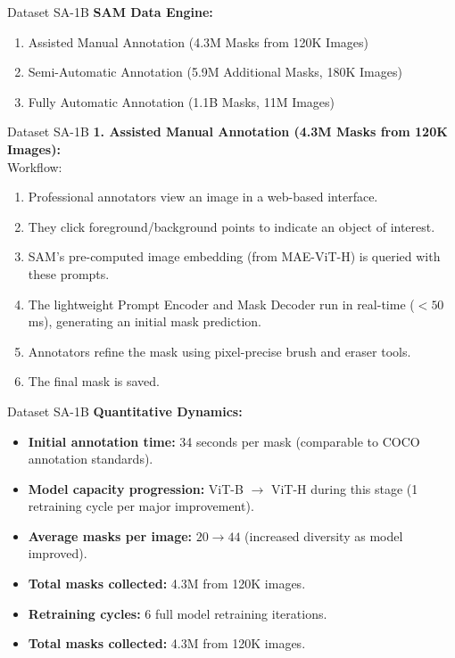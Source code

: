 \documentclass[11pt, aspectratio=169]{beamer}
\begin{document}
\begin{frame}{Dataset SA-1B}
	\textbf{SAM Data Engine:}
	\begin{enumerate}
		\item Assisted Manual Annotation (4.3M Masks from 120K Images)
		\item Semi-Automatic Annotation (5.9M Additional Masks, 180K Images)
		\item Fully Automatic Annotation (1.1B Masks, 11M Images)
	\end{enumerate}
\end{frame}

\begin{frame}{Dataset SA-1B}
	\textbf{1. Assisted Manual Annotation (4.3M Masks from 120K Images):} \\
	Workflow:
	\begin{enumerate}
		\item Professional annotators view an image in a web-based interface.
		\item They click foreground/background points to indicate an object of interest.
		\item SAM's pre-computed image embedding (from MAE-ViT-H) is queried with these prompts.
		\item The lightweight Prompt Encoder and Mask Decoder run in real-time ($< 50$ms), generating an initial mask prediction.
		\item Annotators refine the mask using pixel-precise brush and eraser tools.
		\item The final mask is saved.
	\end{enumerate}
\end{frame}

\begin{frame}{Dataset SA-1B}
	\textbf{Quantitative Dynamics:} \\
	\begin{itemize}
		\item \textbf{Initial annotation time:} 34 seconds per mask (comparable to COCO annotation standards).
		\item \textbf{Model capacity progression:} ViT-B $\rightarrow$ ViT-H during this stage (1 retraining cycle per major improvement).
		\item \textbf{Average masks per image:} $20 \rightarrow 44$ (increased diversity as model improved).
		\item \textbf{Total masks collected:} 4.3M from 120K images.
		\item \textbf{Retraining cycles:} 6 full model retraining iterations.
		\item \textbf{Total masks collected:} 4.3M from 120K images.
	\end{itemize}
\end{frame}
\end{document}
